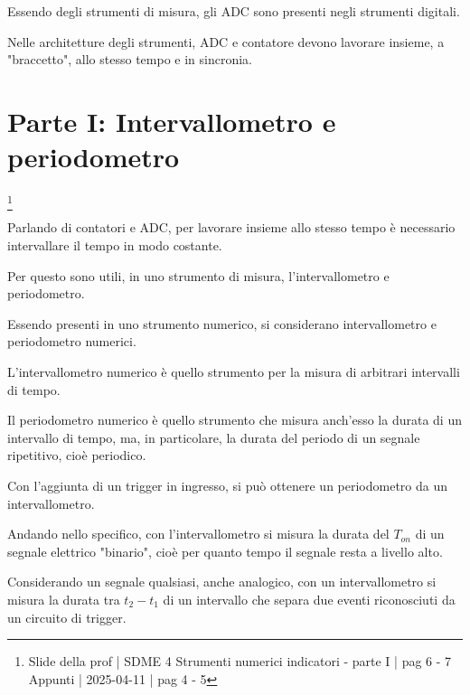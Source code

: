 Essendo degli strumenti di misura, gli ADC sono presenti negli strumenti digitali. \newline

Nelle architetture degli strumenti, ADC e contatore devono lavorare insieme, a "braccetto", allo stesso tempo e in sincronia. \newline 

\newpage 

\section{Parte I: Intervallometro e periodometro}
\footnote{Slide della prof | SDME 4 Strumenti numerici indicatori - parte I | pag 6 - 7 \\  
Appunti | 2025-04-11 | pag 4 - 5}

Parlando di contatori e ADC, per lavorare insieme allo stesso tempo è necessario intervallare il tempo in modo costante. \newline

Per questo sono utili, in uno strumento di misura, l'intervallometro e periodometro. \newline 

Essendo presenti in uno strumento numerico, si considerano intervallometro e periodometro numerici. \newline 

L'intervallometro numerico è quello strumento per la misura di arbitrari intervalli di tempo. \newline 

Il periodometro numerico è quello strumento che misura anch'esso la durata di un intervallo di tempo, 
ma, in particolare, la durata del periodo di un segnale ripetitivo, cioè periodico. \newline 

Con l'aggiunta di un trigger in ingresso, si può ottenere un periodometro da un intervallometro. \newline 

Andando nello specifico, con l'intervallometro si misura la durata del $T_{on}$ di un segnale elettrico "binario", cioè per quanto tempo il segnale resta a livello alto. \newline 

Considerando un segnale qualsiasi, anche analogico, con un intervallometro si misura la durata tra $t_2 - t_1$ di un intervallo che separa due eventi riconosciuti da un circuito di trigger. \newline 

